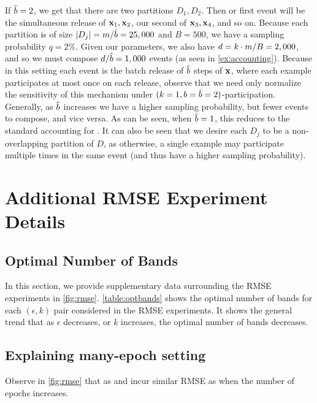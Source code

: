 \documentclass{article}
\begin{document}
If $\hat{b}=2$, we get that there are two partitions $D_1,D_2$. Then or first event will be the simultaneous release of $\mathbf{x}_1,\mathbf{x}_2$, our second of $\mathbf{x}_3, \mathbf{x}_4$, and so on. Because each partition is of size $\lvert D_j\rvert=m/\hat{b}=25,000$ and $B=500$, we have a sampling probability $q=2\%$. Given our parameters, we also have $d=k\cdot m / B=2,000$, and so we must compose $d/\hat{b}=1,000$ events (as seen in \cref{ex:accounting}).
Because in this setting each event is the batch release of $\hat{b}$ steps of $\mathbf{x}$, where each example participates at most once on each release, observe that we need only normalize the sensitivity of this mechanism under $(k=1,b=\hat{b}=2)$-participation.
Generally, as $\hat{b}$ increases we have a higher sampling probability, but fewer events to compose, and vice versa. As can be seen, when $\hat{b}=1$, this reduces to the standard accounting for \dpsgd. It can also be seen that we desire each $D_j$ to be a non-overlapping partition of $D$, as otherwise, a single example may participate multiple times in the same event (and thus have a higher sampling probability). 

\section{Additional RMSE Experiment Details}\label{sec:additional-rmse-details}

\subsection{Optimal Number of Bands}

In this section, we provide supplementary data surrounding the RMSE experiments in \cref{fig:rmse}. \cref{table:optbands} shows the optimal number of bands for each $(\epsilon, k)$ pair considered in the RMSE experiments.  It shows the general trend that as $\epsilon$ decreases, or $k$ increases, the optimal number of bands decreases.  

\subsection{Explaining many-epoch setting}

Observe in \cref{fig:rmse} that as \BANDMF and \memf incur similar RMSE as \dpsgd when the number of epochs increases.  
\end{document}
